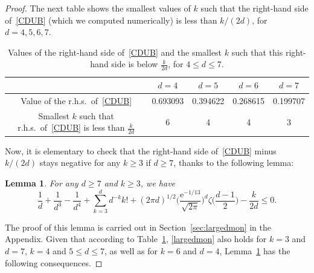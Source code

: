 \documentclass{article}
\newcommand{\e}{\mathrm e}
\newtheorem{lemma}[theorem]{Lemma}
\theoremstyle{definition}
\newcommand{\1}{\mathbbm{1}}
\newcommand{\0}{\mathbf{o}}
\begin{document}
\begin{proof}

The next table shows the smallest values of $k$ such that the right-hand side of~\eqref{CDUB} (which we computed numerically) is less than $k/(2d)$, for $d=4,5,6,7$.
\begin{table}
\begin{center}
    \begin{tabular}{|c|c|c|c|c|} \hline
       &  $d=4$ & $d=5$ & $d=6$ & $d=7$ \\ \hline
        Value of the r.h.s.\ of~\eqref{CDUB}   & 0.693093  & 0.394622  & 0.268615 & 0.199707  \\ \hline
         Smallest $k$ such that r.h.s.\ of~\eqref{CDUB} is less than $\tfrac{k}{2d} $ & 6 & 4 & 4 & 3 \\ \hline 
    \end{tabular}
\end{center}
\caption{Values of the right-hand side of~\eqref{CDUB} and the smallest $k$ such that this right-hand side is below $\tfrac{k}{2d} $, for $4 \leq d \leq 7$.}\label{table-CD}
\end{table}
Now, it is elementary to check that the right-hand side of~\eqref{CDUB} minus $k/(2d)$ stays negative for any $k \geq 3$ if $d \geq 7$, thanks to the following lemma:
\begin{lemma}\label{lemma-largedmon}
For any $d \geq 7$ and $k \geq 3$, we have
\begin{equation}\label{largedmon} \frac{1}{d} + \frac{1}{d^3} -\frac{1}{d^4} + \sum_{k=3}^d d^{-k} k! +  (2\pi d)^{1/2} \Big( \frac{\e^{-1/13}}{\sqrt{2\pi}} \Big)^d \zeta\Big( \frac{d-1}{2} \Big) - \frac{k}{2d} \leq 0.  \end{equation}
\end{lemma}
The proof of this lemma is carried out in Section~\ref{sec:largedmon} in the Appendix. Given that according to Table~\ref{table-CD}, \eqref{largedmon} also holds for $k=3$ and $d=7$, $k=4$ and $5 \leq d \leq 7$, as well as for $k=6$ and $d=4$, Lemma~\ref{lemma-largedmon} has the following consequences.  %

\end{proof}
\end{document}
